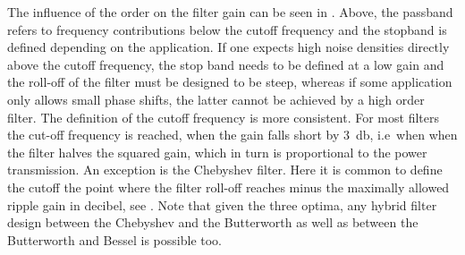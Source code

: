 The influence of the order on the filter gain can be seen in . Above, the passband refers to frequency contributions below the cutoff frequency and the stopband is defined depending on the application. If one expects high noise densities directly above the cutoff frequency, the stop band needs to be defined at a low gain and the roll-off of the filter must be designed to be steep, whereas if some application only allows small phase shifts, the latter cannot be achieved by a high order filter. The definition of the cutoff frequency is more consistent. For most filters the cut-off frequency is reached, when the gain falls short by \SI{3}{\decibel}, i.e\ when when the filter halves the squared gain, which in turn is proportional to the power transmission. An exception is the Chebyshev filter. Here it is common to define the cutoff the point where the filter roll-off reaches minus the maximally allowed ripple gain in decibel, see .
Note that given the three optima, any hybrid filter design between the Chebyshev and the Butterworth as well as between the Butterworth and Bessel is possible too.

